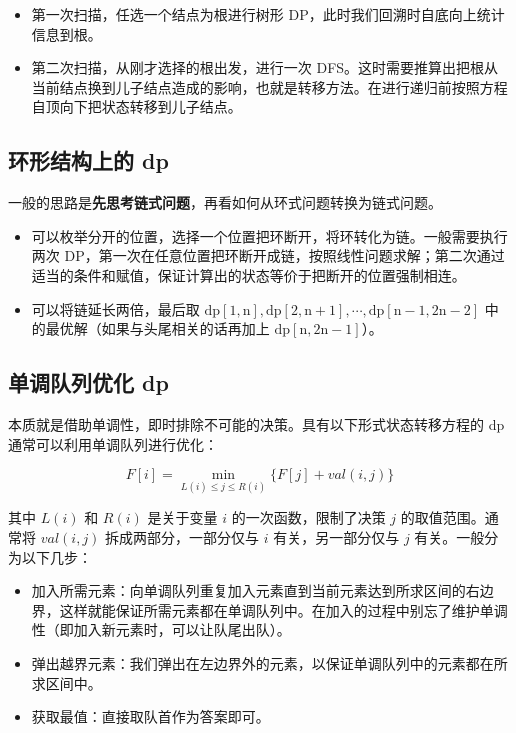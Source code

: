 \documentclass[UTF8]{article}
\begin{document}
\begin{itemize}
	\item 第一次扫描，任选一个结点为根进行树形 DP，此时我们回溯时自底向上统计信息到根。
	\item 第二次扫描，从刚才选择的根出发，进行一次 DFS。这时需要推算出把根从当前结点换到儿子结点造成的影响，也就是转移方法。在进行递归前按照方程自顶向下把状态转移到儿子结点。
\end{itemize}


\subsection{环形结构上的 dp}
一般的思路是\textbf{先思考链式问题}，再看如何从环式问题转换为链式问题。

\begin{itemize}
	\item 可以枚举分开的位置，选择一个位置把环断开，将环转化为链。一般需要执行两次 DP，第一次在任意位置把环断开成链，按照线性问题求解；第二次通过适当的条件和赋值，保证计算出的状态等价于把断开的位置强制相连。
	\item 可以将链延长两倍，最后取 $\mathrm{dp[1,n], dp[2 ,n + 1], \cdots, dp[n - 1, 2n - 2]}$ 中的最优解（如果与头尾相关的话再加上 $\mathrm{dp[n, 2n - 1]}$）。
\end{itemize}


\subsection{单调队列优化 dp}
本质就是借助单调性，即时排除不可能的决策。具有以下形式状态转移方程的 dp 通常可以利用单调队列进行优化：

$$
F[i] = \min\limits_{L(i) \le j \le R(i)} \{F[j] + val(i, j)\}
$$

其中 $L(i)$ 和 $R(i)$ 是关于变量 $i$ 的一次函数，限制了决策 $j$ 的取值范围。通常将 $val(i, j)$ 拆成两部分，一部分仅与 $i$ 有关，另一部分仅与 $j$ 有关。一般分为以下几步：

\begin{itemize}
	\item 加入所需元素：向单调队列重复加入元素直到当前元素达到所求区间的右边界，这样就能保证所需元素都在单调队列中。在加入的过程中别忘了维护单调性（即加入新元素时，可以让队尾出队）。
	\item 弹出越界元素：我们弹出在左边界外的元素，以保证单调队列中的元素都在所求区间中。
	\item 获取最值：直接取队首作为答案即可。
\end{itemize}
\end{document}
